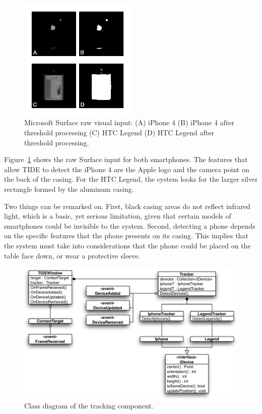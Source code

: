\begin{figure}[htbp]
  \centering
    \includegraphics[width=0.5\textwidth]{images/msRaw}
    \caption{Microsoft Surface raw visual input: (A) iPhone 4 (B) iPhone 4 after threshold processing (C) HTC Legend (D) HTC Legend after threshold processing.}
    \label{fig:msRaw}
\end{figure}

Figure~\ref{fig:msRaw} shows the raw Surface input for both smartphones.
The features that allow TIDE to detect the iPhone 4 are the Apple logo and the camera point on the back of the casing.
For the HTC Legend, the system looks for the larger silver rectangle formed by the aluminum casing.

Two things can be remarked on.
First, black casing areas do not reflect infrared light, which is a basic, yet serious limitation, given that certain models of smartphones could be invisible to the system.
Second, detecting a phone depends on the specific features that the phone presents on its casing.
This implies that the system must take into considerations that the phone could be placed on the table face down, or wear a protective sleeve.

\begin{figure}[htbp]
  \centering
    \includegraphics[width=1\textwidth]{images/trackingDiagram}
    \caption{Class diagram of the tracking component.}
    \label{fig:trackingDiagram}
\end{figure}

